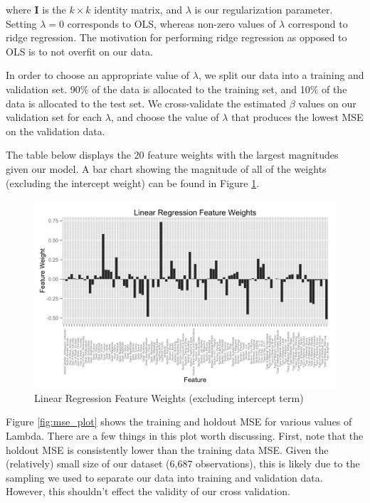 \documentclass[fleqn,12pt]{SelfArx} %
\begin{document}
\noindent where $\mathbf{I}$ is the $k \times k$ identity matrix, and $\lambda$ is our regularization parameter. Setting $\lambda = 0$ corresponds to OLS, whereas non-zero values of $\lambda$ correspond to ridge regression. The motivation for performing ridge regression as opposed to OLS is to not overfit on our data. 

In order to choose an appropriate value of $\lambda$, we split our data into a training and validation set. 90\% of the data is allocated to the training set, and 10\% of the data is allocated to the test set. We cross-validate the estimated $\beta$ values on our validation set for each $\lambda$, and choose the value of $\lambda$ that produces the lowest MSE on the validation data.

The table below displays the 20 feature weights with the largest magnitudes given our model. A bar chart showing the magnitude of all of the weights (excluding the intercept weight) can be found in Figure \ref{fig:lin_reg_weights}.

\begin{figure}[ht]\centering
\includegraphics[width=\linewidth]{feature_weights.png}
\caption{Linear Regression Feature Weights (excluding intercept term)}
\label{fig:lin_reg_weights}
\end{figure}

Figure \ref{fig:mse_plot} shows the training and holdout MSE for various values of Lambda. There are a few things in this plot worth discussing. First, note that the holdout MSE is consistently lower than the training data MSE. Given the (relatively) small size of our dataset (6,687 observations), this is likely due to the sampling we used to separate our data into training and validation data. However, this shouldn't effect the validity of our cross validation.
\end{document}
